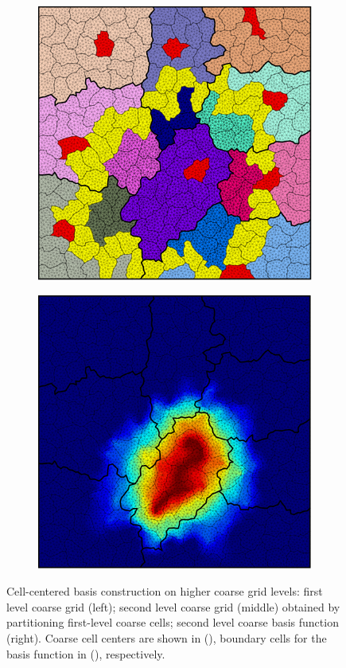 \begin{figure}[htbp]
\begin{subfigure}[t]{0.3\textwidth}
  \end{subfigure}
  \hfill
  \begin{subfigure}[t]{0.3\textwidth}
    \centerline{\includegraphics[width=0.9\linewidth]{figs/square/square_tria_metis_cell_ml_lvl2_grid.png}}
  \end{subfigure}
  \hfill
  \begin{subfigure}[t]{0.3\textwidth}
    \centerline{\includegraphics[width=0.9\linewidth]{figs/square/square_tria_metis_cell_ml_lvl2_basis.png}}
  \end{subfigure}
  \caption[Higher level coarse grids and  cell-centered basis functions]{\label{fig:square_cell_ml} Cell-centered basis construction on higher coarse grid levels: first level coarse grid (left); second level coarse grid (middle) obtained by partitioning first-level coarse cells; second level coarse basis function (right).   Coarse cell centers are shown in (), boundary cells for the basis function in (), respectively.}
\end{figure}

